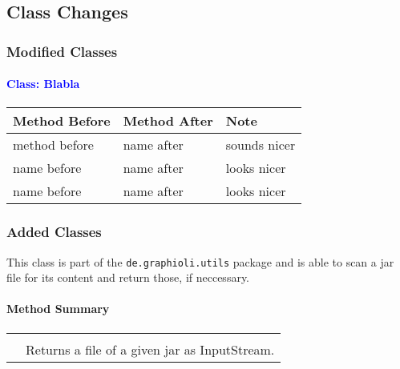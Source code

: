 \subsection{Class Changes}
\subsubsection{Modified Classes}
\paragraph*{\textcolor{Blue}{Class: Blabla}}
\paragraph*{}
\begin{longtable}{llp{10cm}}
	\hline\rowcolor{white}\textbf{Method Before} & \textbf{Method After} & \textbf{Note} \\ \hline
	method before & name after & sounds nicer \\
	name before & name after & looks nicer \\
	name before & name after & looks nicer \\
	\hline
\end{longtable}

\subsubsection{Added Classes}
This class is part of the \texttt{de.graphioli.utils} package and is able to scan a jar file for its content and return those, if neccessary. \\

\paragraph*{Method Summary}
\paragraph*{}
\begin{longtable}{Lp{10cm}}
	\startmethodtable
	 \\
	& Returns a file of a given jar as InputStream. \\
	\hline
\end{longtable}

